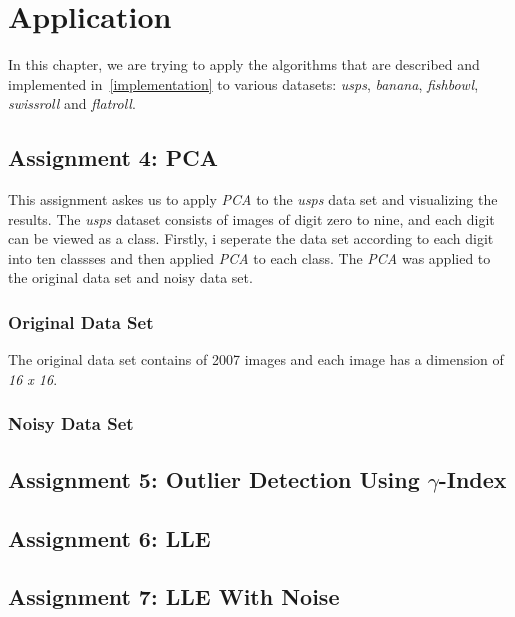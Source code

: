 \chapter{Application}
\label{application}

In this chapter, we are trying to apply the algorithms that are described and implemented in~\ref{implementation} to various datasets: \textit{usps}, \textit{banana}, \textit{fishbowl}, \textit{swissroll} and \textit{flatroll}.

\section{Assignment 4: PCA}
\label{assignment4}

This assignment askes us to apply \textit{PCA} to the \textit{usps} data set and visualizing the results. The \textit{usps} dataset consists of images of digit zero to nine, and each digit can be viewed as a class. Firstly, i seperate the data set according to each digit into ten classses and then applied \textit{PCA} to each class. The \textit{PCA} was applied to the original data set and noisy data set.

\subsection{Original Data Set}
\label{ass4:original}

The original data set contains of 2007 images and each image has a dimension of \textit{16 x 16}. 

\subsection{Noisy Data Set}
\label{ass4:noisy}




\section{Assignment 5: Outlier Detection Using $\gamma$-Index}
\label{assignment5}


\section{Assignment 6: LLE}
\label{assignment6}


\section{Assignment 7: LLE With Noise}
\label{assignment7}